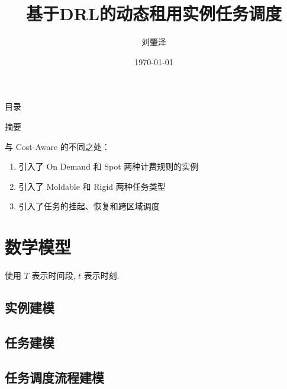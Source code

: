 \documentclass[aspectratio=169]{beamer}
\title{基于DRL的动态租用实例任务调度}
\author{刘肇泽}
\institute{控制与计算机工程学院}
\date{\today}
\begin{document}
\begin{frame}[noframenumbering]

    \titlepage

\end{frame}

\begin{frame}{目录}

    \centering
    \begin{minipage}{0.8\textwidth}
        \tableofcontents
    \end{minipage}

\end{frame}

\begin{frame}{摘要}

    与 Cost-Aware 的不同之处：

    \begin{enumerate}
        \item 引入了 On Demand 和 Spot 两种计费规则的实例
        \item 引入了 Moldable 和 Rigid 两种任务类型
        \item 引入了任务的挂起、恢复和跨区域调度
    \end{enumerate}

\end{frame}

\section{数学模型}

\begin{frame}

    \centering
    使用 $T$ 表示时间段, $t$ 表示时刻.

\end{frame}

\subsection{实例建模}



\subsection{任务建模}



\subsection{任务调度流程建模}
\end{document}
